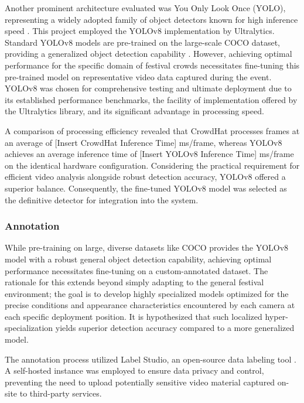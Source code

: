Another prominent architecture evaluated was You Only Look Once (YOLO), representing a widely adopted family of object detectors known for high inference speed \cite{yolo}. This project employed the YOLOv8 implementation by Ultralytics. Standard YOLOv8 models are pre-trained on the large-scale COCO dataset, providing a generalized object detection capability\cite{ultralytics} \cite{coco}. However, achieving optimal performance for the specific domain of festival crowds necessitates fine-tuning this pre-trained model on representative video data captured during the event. YOLOv8 was chosen for comprehensive testing and ultimate deployment due to its established performance benchmarks, the facility of implementation offered by the Ultralytics library, and its significant advantage in processing speed.

A comparison of processing efficiency revealed that CrowdHat processes frames at an average of [Insert CrowdHat Inference Time] ms/frame, whereas YOLOv8 achieves an average inference time of [Insert YOLOv8 Inference Time] ms/frame on the identical hardware configuration. Considering the practical requirement for efficient video analysis alongside robust detection accuracy, YOLOv8 offered a superior balance. Consequently, the fine-tuned YOLOv8 model was selected as the definitive detector for integration into the system.



\subsubsection{Annotation}

While pre-training on large, diverse datasets like COCO provides the YOLOv8 model with a robust general object detection capability, achieving optimal performance necessitates fine-tuning on a custom-annotated dataset. The rationale for this extends beyond simply adapting to the general festival environment; the goal is to develop highly specialized models optimized for the precise conditions and appearance characteristics encountered by each camera at each specific deployment position. It is hypothesized that such localized hyper-specialization yields superior detection accuracy compared to a more generalized model.

The annotation process utilized Label Studio, an open-source data labeling tool \cite{label_studio}. A self-hosted instance was employed to ensure data privacy and control, preventing the need to upload potentially sensitive video material captured on-site to third-party services.

